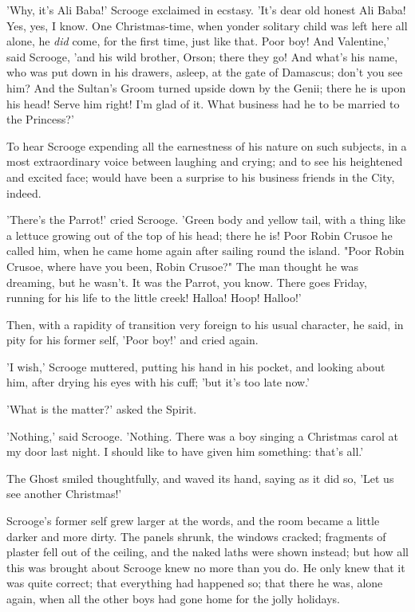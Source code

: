 'Why, it's Ali Baba!' Scrooge exclaimed in ecstasy. 'It's dear old
honest Ali Baba! Yes, yes, I know. One Christmas-time, when yonder
solitary child was left here all alone, he \emph{did} come, for the first
time, just like that. Poor boy! And Valentine,' said Scrooge, 'and his
wild brother, Orson; there they go! And what's his name, who was put
down in his drawers, asleep, at the gate of Damascus; don't you see him?
And the Sultan's Groom turned upside down by the Genii; there he is upon
his head! Serve him right! I'm glad of it. What business had he to be
married to the Princess?'

To hear Scrooge expending all the earnestness of his nature on such
subjects, in a most extraordinary voice between laughing and crying; and
to see his heightened and excited face; would have been a surprise to
his business friends in the City, indeed.

'There's the Parrot!' cried Scrooge. 'Green body and yellow tail, with a
thing like a lettuce growing out of the top of his head; there he is!
Poor Robin Crusoe he called him, when he came home again after sailing
round the island. "Poor Robin Crusoe, where have you been, Robin
Crusoe?" The man thought he was dreaming, but he wasn't. It was the
Parrot, you know. There goes Friday, running for his life to the little
creek! Halloa! Hoop! Halloo!'

Then, with a rapidity of transition very foreign to his usual character,
he said, in pity for his former self, 'Poor boy!' and cried again.

'I wish,' Scrooge muttered, putting his hand in his pocket, and looking
about him, after drying his eyes with his cuff; 'but it's too late now.'

'What is the matter?' asked the Spirit.

'Nothing,' said Scrooge. 'Nothing. There was a boy singing a Christmas
carol at my door last night. I should like to have given him something:
that's all.'

The Ghost smiled thoughtfully, and waved its hand, saying as it did so,
'Let us see another Christmas!'

Scrooge's former self grew larger at the words, and the room became a
little darker and more dirty. The panels shrunk, the windows cracked;
fragments of plaster fell out of the ceiling, and the naked laths were
shown instead; but how all this was brought about Scrooge knew no more
than you do. He only knew that it was quite correct; that everything had
happened so; that there he was, alone again, when all the other boys had
gone home for the jolly holidays.


